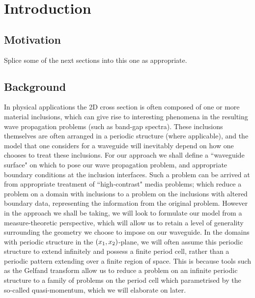 \chapter{Introduction}

\section{Motivation}
Splice some of the next sections into this one as appropriate.

\section{Background}
In physical applications the 2D cross section is often composed of one or more material inclusions, which can give rise to interesting phenomena in the resulting wave propagation problems (such as band-gap spectra).
These inclusions themselves are often arranged in a periodic structure (where applicable), and the model that one considers for a waveguide will inevitably depend on how one chooses to treat these inclusions.
For our approach we shall define a ``waveguide surface" on which to pose our wave propagation problem, and appropriate boundary conditions at the inclusion interfaces.
Such a problem can be arrived at from appropriate treatment of ``high-contrast" media problems; which reduce a problem on a domain with inclusions to a problem on the inclusions with altered boundary data, representing the information from the original problem.
However in the approach we shall be taking, we will look to formulate our model from a measure-theoretic perspective, which will allow us to retain a level of generality surrounding the geometry we choose to impose on our waveguide. 
In the domains with periodic structure in the $\left( x_1,x_2 \right)$-plane, we will often assume this periodic structure to extend infinitely and possess a finite period cell, rather than a periodic pattern extending over a finite region of space.
This is because tools such as the Gelfand transform allow us to reduce a problem on an infinite periodic structure to a family of problems on the period cell which parametrised by the so-called quasi-momentum, which we will elaborate on later.

